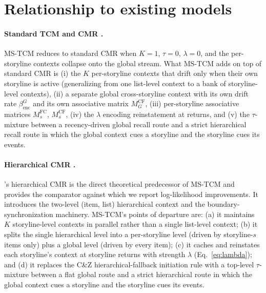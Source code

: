 \documentclass[10pt]{article}
\newcommand{\MCFG}{M^{\mathrm{CF}}_{G}}
\newcommand{\MCFs}{M^{\mathrm{CF}}_{s}}
\newcommand{\MFCs}{M^{\mathrm{FC}}_{s}}
\newcommand{\betaencG}{\beta_{\mathrm{enc}}^{G}}
\newcommand{\tauinit}{\tau}
\begin{document}
\section{Relationship to existing models}
\label{sec:lit}

\paragraph{Standard TCM \citep{HowaKaha02a} and CMR \citep{PolyEtal09}.}
MS-TCM reduces to standard CMR when $K=1$, $\tauinit=0$,
$\lambda = 0$, and the per-storyline contexts collapse onto the
global stream. What MS-TCM adds on top of standard CMR is (i) the
$K$ per-storyline contexts that drift only when their own storyline
is active (generalizing \citealp{CornellZhang2025} from one
list-level context to a bank of storyline-level contexts), (ii) a
separate global cross-storyline context with its own drift rate
$\betaencG$ and its own associative matrix $\MCFG$, (iii) per-storyline
associative matrices $\MFCs$, $\MCFs$, (iv) the $\lambda$ encoding
reinstatement at returns, and (v) the $\tauinit$-mixture between a
recency-driven global recall route and a strict hierarchical recall
route in which the global context cues a storyline and the storyline
cues its events.

\paragraph{Hierarchical CMR \citep{CornellZhang2025}.}
\citeauthor{CornellZhang2025}'s hierarchical CMR is the direct
theoretical predecessor of MS-TCM and provides the comparator against
which we report log-likelihood improvements. It introduces the
two-level (item, list) hierarchical context and the
boundary-synchronization machinery. MS-TCM's points of departure are:
(a) it maintains $K$ storyline-level contexts in parallel rather than
a single list-level context; (b) it splits the single hierarchical
level into a per-storyline level (driven by storyline-$s$ items
only) plus a global level (driven by every item); (c) it caches and
reinstates each storyline's context at storyline returns with strength
$\lambda$ (Eq.~\ref{eq:lambda}); and (d) it replaces the C\&Z
hierarchical-fallback initiation rule with a top-level
$\tauinit$-mixture between a flat global route and a strict
hierarchical route in which the global context cues a storyline and
the storyline cues its events.
\end{document}

